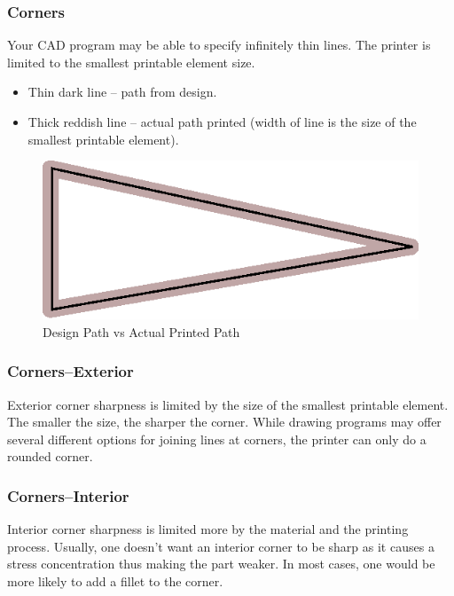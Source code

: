 \documentclass[english,10pt]{beamer}
\begin{document}
\begin{frame}
  \frametitle{Corners}
  Your CAD program may be able to specify infinitely thin lines.  The printer is limited to the smallest printable element size.
  \begin{itemize}
    \item Thin dark line -- path from design.
    \item Thick reddish line -- actual path printed (width of line is the size of the smallest printable element).
  \end{itemize}
  \begin{figure}
%
%
    \includegraphics{Corner1.eps}
    \caption{Design Path vs Actual Printed Path}
  \end{figure}
\end{frame}

\begin{frame}
  \frametitle{Corners--Exterior}
  Exterior corner sharpness is limited by the size of the smallest printable element.  The smaller the size, the sharper the corner.  While drawing programs may offer several different options for joining lines at corners, the printer can only do a rounded corner.
\end{frame}

\begin{frame}
  \frametitle{Corners--Interior}
  Interior corner sharpness is limited more by the material and the printing process.  Usually, one doesn't want an interior corner to be sharp as it causes a stress concentration thus making the part weaker.  In most cases, one would be more likely to add a fillet to the corner.
\end{frame}
\end{document}
